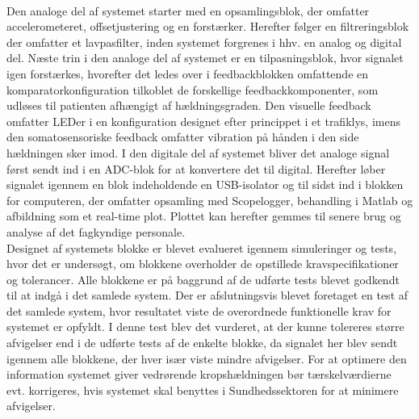  \\
Den analoge del af systemet starter med en opsamlingsblok, der omfatter accelerometeret, offsetjustering og en forstærker. Herefter følger en filtreringsblok der omfatter et lavpasfilter, inden systemet forgrenes i hhv. en analog og digital del. Næste trin i den analoge del af systemet er en tilpasningsblok, hvor signalet igen forstærkes, hvorefter det ledes over i feedbackblokken omfattende en komparatorkonfiguration tilkoblet de forskellige feedbackkomponenter, som udløses til patienten afhængigt af hældningsgraden. Den visuelle feedback omfatter LEDer i en konfiguration designet efter princippet i et trafiklys, imens den somatosensoriske feedback omfatter vibration på hånden i den side hældningen sker imod. 
I den digitale del af systemet bliver det analoge signal først sendt ind i en ADC-blok for at konvertere det til digital. Herefter løber signalet igennem en blok indeholdende en USB-isolator og til sidst ind i blokken for computeren, der omfatter opsamling med Scopelogger, behandling i Matlab og afbildning som et real-time plot. Plottet kan herefter gemmes til senere brug og analyse af det fagkyndige personale. \\
Designet af systemets blokke er blevet evalueret igennem simuleringer og tests, hvor det er undersøgt, om blokkene overholder de opstillede kravspecifikationer og tolerancer. Alle blokkene er på baggrund af de udførte tests blevet godkendt til at indgå i det samlede system. Der er afslutningsvis blevet foretaget en test af det samlede system, hvor resultatet viste de overordnede funktionelle krav for systemet er opfyldt. I denne test blev det vurderet, at der kunne tolereres større afvigelser end i de udførte tests af de enkelte blokke, da signalet her blev sendt igennem alle blokkene, der hver især viste mindre afvigelser. For at optimere den information systemet giver vedrørende kropshældningen bør tærskelværdierne evt. korrigeres, hvis systemet skal benyttes i Sundhedssektoren for at minimere afvigelser.  


\clearpage